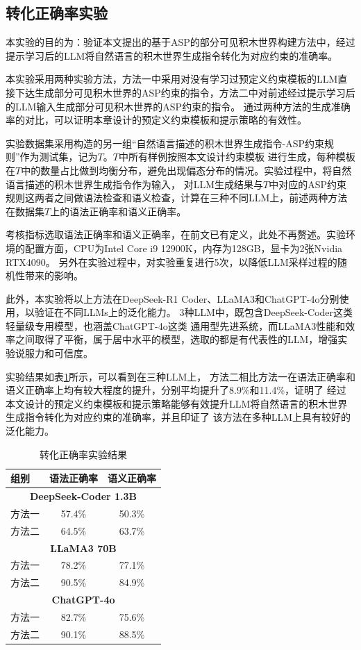 \subsection{转化正确率实验}
本实验的目的为：验证本文提出的基于ASP的部分可见积木世界构建方法中，经过提示学习后的LLM将自然语言的积木世界生成指令转化为对应约束的准确率。

本实验采用两种实验方法，方法一中采用对没有学习过预定义约束模板的LLM直接下达生成部分可见积木世界的ASP约束的指令，方法二中对前述经过提示学习后的LLM输入生成部分可见积木世界的ASP约束的指令。
通过两种方法的生成准确率的对比，可以证明本章设计的预定义约束模板和提示策略的有效性。

实验数据集采用构造的另一组“自然语言描述的积木世界生成指令-ASP约束规则”作为测试集，记为$T$。$T$中所有样例按照本文设计约束模板
进行生成，每种模板在$T$中的数量占比做到均衡分布，避免出现偏态分布的情况。实验过程中，将自然语言描述的积木世界生成指令作为输入，
对LLM生成结果与$T$中对应的ASP约束规则这两者之间做语法检查和语义检查，计算在三种不同LLM上，前述两种方法在数据集$T$上的语法正确率和语义正确率。

考核指标选取语法正确率和语义正确率，在前文已有定义，此处不再赘述。实验环境的配置方面，CPU为Intel Core i9 12900K，内存为128GB，显卡为2张Nvidia RTX4090。
另外在实验过程中，对实验重复进行5次，以降低LLM采样过程的随机性带来的影响。

此外，本实验将以上方法在DeepSeek-R1 Coder、LLaMA3和ChatGPT-4o分别使用，以验证在不同LLMs上的泛化能力。
3种LLM中，既包含DeepSeek-Coder这类轻量级专用模型，也涵盖ChatGPT-4o这类
通用型先进系统，而LLaMA3性能和效率之间取得了平衡，属于居中水平的模型，选取的都是有代表性的LLM，增强实验说服力和可信度。

实验结果如表\ref{tab:asp-based-constraint-construction}所示，可以看到在三种LLM上，
方法二相比方法一在语法正确率和语义正确率上均有较大程度的提升，分别平均提升了8.9\%和11.4\%，证明了
经过本文设计的预定义约束模板和提示策略能够有效提升LLM将自然语言的积木世界生成指令转化为对应约束的准确率，并且印证了
该方法在多种LLM上具有较好的泛化能力。
\begin{table}[h]
    \centering
    \begin{tabular}{lcc}
        \toprule
        \textbf{组别} & \textbf{语法正确率} & \textbf{语义正确率} \\
        \midrule
        \multicolumn{3}{c}{\textbf{DeepSeek-Coder 1.3B}} \\
        方法一 & 57.4\% & 50.3\% \\
        方法二 & 64.5\% & 63.7\% \\
        \midrule
        \multicolumn{3}{c}{\textbf{LLaMA3 70B}} \\
        方法一 & 78.2\% & 77.1\% \\
        方法二 & 90.5\% & 84.9\% \\
        \midrule
        \multicolumn{3}{c}{\textbf{ChatGPT-4o}} \\
        方法一 & 82.7\% & 75.6\% \\
        方法二 & 90.1\% & 88.5\% \\
        \bottomrule
    \end{tabular}
    \caption{转化正确率实验结果}
    \label{tab:asp-based-constraint-construction}
\end{table}

